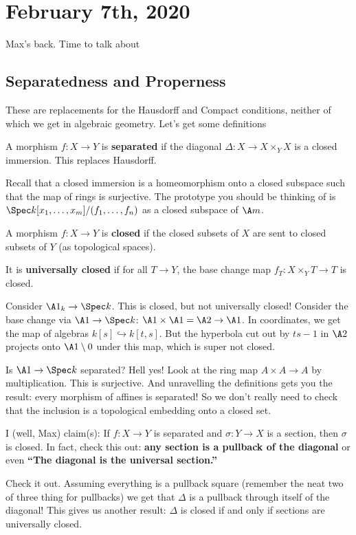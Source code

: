 \documentclass[12pt]{article}
\begin{document}
\section{February 7th, 2020}
Max's back. Time to talk about 
\subsection{Separatedness and Properness}
These are replacements for the Hausdorff and Compact conditions, neither of which we get in algebraic geometry. Let's get some definitions 
\begin{defn}
	A morphism $f:X\to Y$ is \textbf{separated} if the diagonal $\Delta:X\to X\times_Y X$ is a closed immersion. This 
	replaces Hausdorff.
\end{defn}
Recall that a closed immersion is a homeomorphism onto a closed subspace such that the map of rings is surjective. 
The prototype you should be thinking of is $\Spec k[x_1,\dots,x_m]/(f_1,\dots,f_n)$ as a closed subspace of $\A m$.
\begin{defn}
	A morphism $f:X\to Y$ is \textbf{closed} if the closed subsets of $X$ are sent to closed subsets of $Y$ (as topological spaces).

	It is \textbf{universally closed} if for all $T\to Y$, the base change map $f_T:X\times_Y T\to T$ is closed.
\end{defn}
\begin{ex}
	Consider $\A1_k\to\Spec k$. This is closed, but not universally closed! Consider the base change via $\A1\to\Spec k$:
	$\A1\times\A1=\A2\to \A1$. In coordinates, we get the map of algebras $k[s]\hookrightarrow k[t,s]$. But the hyperbola 
	cut out by $ts-1$ in $\A2$ projects onto $\A1\setminus 0$ under this map, which is super not closed.

	Is $\A1\to \Spec k$ separated? Hell yes! Look at the ring map $A\times A\to A$ by multiplication. This is surjective.
	And unravelling the definitions gets you the result: every morphism of affines is separated! So we don't really need to check 
	that the inclusion is a topological embedding onto a closed set.
\end{ex}

I (well, Max) claim(s): If $f:X\to Y$ is separated and $\sigma:Y\to X$ is a section, then $\sigma$ is closed.
In fact, check this out: \textbf{any section is a pullback of the diagonal} or even \textbf{``The diagonal is the universal section.''}

\begin{figure}[h]
	\centering
\end{figure}
Check it out. Assuming everything is a pullback square (remember the neat two of three thing for pullbacks) we get that $\Delta$ is 
a pullback through itself of the diagonal! This gives us another result: $\Delta$ is closed if and only if sections are universally closed.
\end{document}

